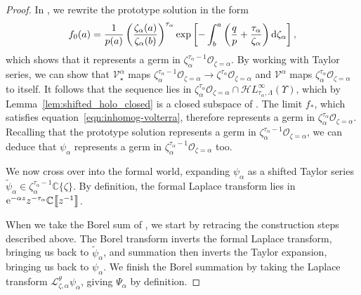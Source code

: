 \documentclass[10pt,a4paper]{amsart}
\newcommand{\singexp}[2]{\mathcal{H}L^\infty_{#1, #2}}
\newcommand{\C}{\mathbb{C}}
\newcommand{\volterra}{\mathcal{V}}
\newcommand{\softpart}{\mathcal{V}_\star}
\newcommand{\solproto}{f_0}
\newcommand{\solptb}{f_\star}
\newcommand{\series}[1]{\tilde{#1}}
\newcommand{\laplace}{\mathcal{L}}
\numberwithin{equation}{section}
\begin{document}
\begin{proof}
In \cite[Section~3.2.1]{reg-sing-volterra}, we rewrite the prototype solution in the form
\[ \solproto(a) = \frac{1}{p(a)} \left(\frac{\zeta_\alpha(a)}{\zeta_\alpha(b)}\right)^{\tau_\alpha} \exp\left[-\int_b^a \left( \frac{q}{p} + \frac{\tau_\alpha}{\zeta_\alpha} \right) {\rm d}\zeta_\alpha\right], \]
which shows that it represents a germ in $\zeta_\alpha^{\tau_\alpha-1} \mathcal{O}_{\zeta = \alpha}$. By working with Taylor series, we can show that $\softpart^\alpha$ maps
$\zeta_\alpha^{\tau_\alpha-1} \mathcal{O}_{\zeta=\alpha} \to \zeta^{\tau_\alpha} \mathcal{O}_{\zeta=\alpha} $
and $\volterra^\alpha$ maps $\zeta_\alpha^{\tau_\alpha} \mathcal{O}_{\zeta=\alpha}$ to itself. It follows that the sequence \smash{$\solptb^{(0)}, \solptb^{(1)}, \solptb^{(2)}, \dots$} lies in $\zeta_\alpha^{\tau_\alpha} \mathcal{O}_{\zeta=\alpha} \cap \singexp{\tau_\alpha}{\Lambda}(\Upsilon)$, which by Lemma~\ref{lem:shifted_holo_closed} is a closed subspace of \smash{$\singexp{\tau_\alpha}{\Lambda}(\Upsilon)$}. The limit $f_*$, which satisfies equation~\eqref{eqn:inhomog-volterra}, therefore represents a germ in $\zeta_\alpha^{\tau_\alpha} \mathcal{O}_{\zeta = \alpha}$. Recalling that the prototype solution represents a germ in $\zeta_\alpha^{\tau_\alpha-1} \mathcal{O}_{\zeta = \alpha}$, we can deduce that $\psi_\alpha$ represents a germ in $\zeta_\alpha^{\tau_\alpha-1} \mathcal{O}_{\zeta = \alpha}$ too.

We now cross over into the formal world, expanding $\psi_\alpha$ as a shifted Taylor series $\series{\psi}_\alpha \in \zeta_\alpha^{\tau_\alpha-1} \C\{\zeta\}$. By definition, the formal Laplace transform \smash{$\series{\Psi}_\alpha = \laplace_{\zeta, \alpha} \series{\psi}_\alpha$} lies in ${\rm e}^{-\alpha z} z^{-\tau_\alpha} \C \big\llbracket z^{-1} \big\rrbracket$.

When we take the Borel sum of \smash{$\series{\Psi}_\alpha$}, we start by retracing the construction steps described above. The Borel transform inverts the formal Laplace transform, bringing us back to $\series{\psi}_\alpha$, and summation then inverts the Taylor expansion, bringing us back to $\psi_\alpha$. We finish the Borel summation by taking the Laplace transform $\laplace^\theta_{\zeta, \alpha} \psi_\alpha$, giving $\Psi_\alpha$ by definition.
\end{proof}
\end{document}
